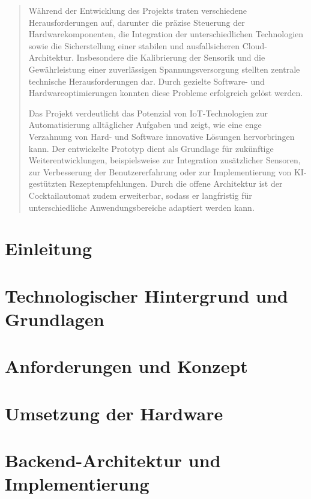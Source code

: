\documentclass[a4paper, 10pt]{article} %
\begin{document}
\begin{abstract}
Während der Entwicklung des Projekts traten verschiedene Herausforderungen auf, darunter die präzise Steuerung der Hardwarekomponenten, die Integration der unterschiedlichen Technologien sowie die Sicherstellung einer stabilen und ausfallsicheren Cloud-Architektur. Insbesondere die Kalibrierung der Sensorik und die Gewährleistung einer zuverlässigen Spannungsversorgung stellten zentrale technische Herausforderungen dar. Durch gezielte Software- und Hardwareoptimierungen konnten diese Probleme erfolgreich gelöst werden.

Das Projekt verdeutlicht das Potenzial von IoT-Technologien zur Automatisierung alltäglicher Aufgaben und zeigt, wie eine enge Verzahnung von Hard- und Software innovative Lösungen hervorbringen kann. Der entwickelte Prototyp dient als Grundlage für zukünftige Weiterentwicklungen, beispielsweise zur Integration zusätzlicher Sensoren, zur Verbesserung der Benutzererfahrung oder zur Implementierung von KI-gestützten Rezeptempfehlungen. Durch die offene Architektur ist der Cocktailautomat zudem erweiterbar, sodass er langfristig für unterschiedliche Anwendungsbereiche adaptiert werden kann.

\end{abstract}

\newpage

\section{Einleitung}
    

\section{Technologischer Hintergrund und Grundlagen}
    

\section{Anforderungen und Konzept}
    

\section{Umsetzung der Hardware}
    

\section{Backend-Architektur und Implementierung}
    
\end{document}
